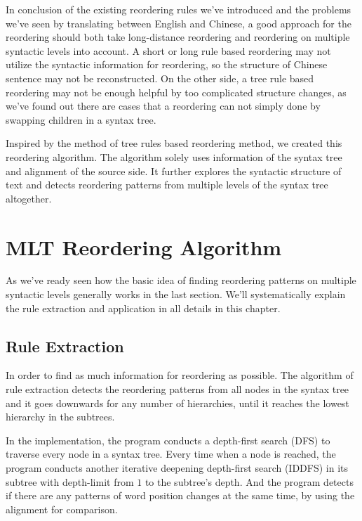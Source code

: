 In conclusion of the existing reordering rules we've introduced and the problems we've seen by translating between English and Chinese, a good approach for the reordering should both take long-distance reordering and reordering on multiple syntactic levels into account. A short or long rule based reordering may not utilize the syntactic information for reordering, so the structure of Chinese sentence may not be reconstructed. On the other side, a tree rule based reordering may not be enough helpful by too complicated structure changes, as we've found out there are cases that a reordering can not simply done by swapping children in a syntax tree. 

Inspired by the method of tree rules based reordering method, we created this reordering algorithm. The algorithm solely uses information of the syntax tree and alignment of the source side. It further explores the syntactic structure of text and detects reordering patterns from multiple levels of the syntax tree altogether.

\section{MLT Reordering Algorithm}
\label{ch:ReorderingApproach:sec:Algorithm}

As we've ready seen how the basic idea of finding reordering patterns on multiple syntactic levels generally works in the last section. We'll systematically explain the rule extraction and application in all details in this chapter.

\subsection{Rule Extraction}

In order to find as much information for reordering as possible. The algorithm of rule extraction detects the reordering patterns from all nodes in the syntax tree and it goes downwards for any number of hierarchies, until it reaches the lowest hierarchy in the subtrees.

In the implementation, the program conducts a depth-first search (DFS) to traverse every node in a syntax tree. Every time when a node is reached, the program conducts another iterative deepening depth-first search (IDDFS) in its subtree with depth-limit from $1$ to the subtree's depth. And the program detects if there are any patterns of word position changes at the same time, by using the alignment for comparison.

